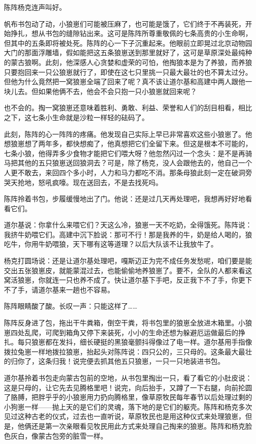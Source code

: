 \par 陈阵杨克连声叫好。
\par 帆布书包动了动，小狼崽们可能被压麻了，也可能是饿了，它们终于不再装死，开始挣扎，想从书包的缝隙钻出来。这可是陈阵所尊重敬佩的七条高贵的小生命啊，但其中的五条即将被处死。陈阵的心一下子沉重起来。他眼前立即晃过北京动物园大门的那面浮雕墙，假如能把这五条狼崽送到那里就好了，这可是草原深处最纯种的蒙古狼啊。此刻，他深感人心贪婪和虚荣的可怕，他掏狼本是为了养狼，而养狼只要抱回来一只公狼崽就行了，即使在这七只里挑一只最大最壮的也不算太过分。但他为什么竟然把一窝狼崽全端了回来了呢？真不该让道尔基和高建中两人跟他一块儿去。但如果他俩不去，他会不会只抱一只小狼崽就回来呢？
\par 也不会的。掏一窝狼崽还意味着胜利、勇敢、利益、荣誉和人们的刮目相看，相比之下，这七条小生命就是沙粒一样轻的砝码了。
\par 此刻，陈阵的心一阵阵的疼痛。他发现自己实际上早已非常喜欢这些小狼崽了。他想狼崽想了两年多，都快想痴了，他真想把它们全留下来。但这是根本不可能的，七条小狼，他得弄多少食物才能把它们喂大呀？他忽然闪过一个念头：是不是再骑马把其他的五只狼崽送回狼洞去？可是，除了杨克，没人会跟他去的，他自己一个人更不敢去，来回四个多小时，人力和马力都吃不消。那条母狼此刻一定在破洞旁哭天抢地，怒吼疯嚎。现在送回去，不是去找死吗。
\par 陈阵拎着书包，步履缓慢地出了门。他说：还是过几天再处理吧，我想再好好地看看它们。
\par 道尔基说：你拿什么来喂它们？天这么冷，狼崽一天不吃奶，全得饿死。陈阵说：我挤牛奶喂它们。高建中沉下脸说：那可不行！那是我养的牛，奶是给人喝的，狼吃牛，你用牛奶喂狼，天下哪有这等道理？以后大队该不让我放牛了。
\par 杨克打圆场说：还是让道尔基处理吧，嘎斯迈正为完不成任务发愁呢，咱们要是能交出五张狼崽皮，就能蒙混过去，也能偷偷地养狼崽了。要不，全队的人都来看这窝活狼崽，你就连一只也养不成了。快让道尔基下手吧，反正我下不了手，你更下不了手，请道尔基来一趟也不容易。
\par 陈阵眼睛酸了酸。长叹一声：只能这样了……
\par 陈阵反身进了包，拖出干牛粪箱，倒空干粪，将书包里的狼崽全放进木箱里。小狼崽四处乱爬，可爬到箱角又停下来装死，小小的生命还想为躲避厄运做最后的挣扎。每只狼崽都在发抖，细长硬挺的黑狼毫颤抖得像过了电一样。道尔基用手指像拨拉兔崽一样地拨拉狼崽，抬起头对陈阵说：四只公的，三只母的。这条最大最壮的归你了，这条归我！说完便去抓其他五只狼崽，一只一只地装进书包。
\par 道尔基拎着书包走向蒙古包前的空地，从书包里掏出一只，看了看它的小肚皮说：这是只母的，让它先去见腾格里吧！说完，向后抬手，又蹲了一下右腿，向前抡圆了胳膊，把胖乎乎的小狼崽用力扔向腾格里，像草原牧民每年春节以后处理过剩的小狗崽一样——抛上天的是它们的灵魂，落下地的是它们的躯壳。陈阵和杨克多次见过这种古老的仪式，过去也一直听说，草原牧民也是用这种仪式来处理狼崽，但是，他俩还是第一次亲眼看见牧民用此方式来处理自己掏来的狼崽。陈阵和杨克脸色灰白，像蒙古包旁的脏雪一样。
